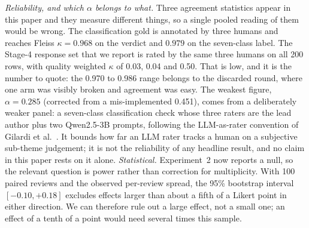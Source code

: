 \documentclass[preprint,12pt]{elsarticle}
\begin{document}
\emph{Reliability, and which $\alpha$ belongs to what.} Three agreement statistics appear in this paper and they measure different things, so a single pooled reading of them would be wrong. The classification gold is annotated by three humans and reaches Fleiss $\kappa = 0.968$ on the verdict and $0.979$ on the seven-class label. The Stage-4 response set that we report is rated by the same three humans on all 200 rows, with quality weighted $\kappa$ of 0.03, 0.04 and 0.50. That is low, and it is the number to quote: the 0.970 to 0.986 range belongs to the discarded round, where one arm was visibly broken and agreement was easy. The weakest figure, $\alpha = 0.285$ (corrected from a mis-implemented 0.451), comes from a deliberately weaker panel: a seven-class classification check whose three raters are the lead author plus two Qwen2.5-3B prompts, following the LLM-as-rater convention of Gilardi et al.~\cite{gilardi2023chatgpt}. It bounds how far an LLM rater tracks a human on a subjective sub-theme judgement; it is not the reliability of any headline result, and no claim in this paper rests on it alone.
\emph{Statistical.} Experiment~2 now reports a null, so the relevant question is power rather than correction for multiplicity. With 100 paired reviews and the observed per-review spread, the 95\% bootstrap interval $[-0.10, +0.18]$ excludes effects larger than about a fifth of a Likert point in either direction. We can therefore rule out a large effect, not a small one; an effect of a tenth of a point would need several times this sample.
\end{document}
